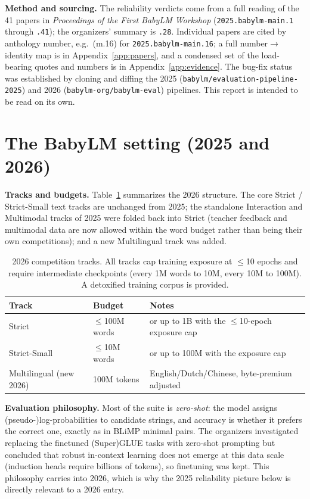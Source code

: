 \documentclass[11pt]{article}
\begin{document}
\textbf{Method and sourcing.} The reliability verdicts come from a full reading of the 41
papers in \emph{Proceedings of the First BabyLM Workshop} (\texttt{2025.babylm-main.1}
through \texttt{.41}); the organizers' summary is \texttt{.28}. Individual papers are cited
by anthology number, e.g.\ (m.16) for \texttt{2025.babylm-main.16}; a full number$\to$identity
map is in Appendix~\ref{app:papers}, and a condensed set of the load-bearing quotes and
numbers is in Appendix~\ref{app:evidence}. The bug-fix status was established by cloning and
diffing the 2025 (\texttt{babylm/evaluation-pipeline-2025}) and 2026
(\texttt{babylm-org/babylm-eval}) pipelines. This report is intended to be read on its own.

\section{The BabyLM setting (2025 and 2026)}
\label{sec:setting}
\textbf{Tracks and budgets.} Table~\ref{tab:tracks} summarizes the 2026 structure. The core
Strict / Strict-Small text tracks are unchanged from 2025; the standalone Interaction and
Multimodal tracks of 2025 were folded back into Strict (teacher feedback and multimodal data
are now allowed within the word budget rather than being their own competitions); and a new
Multilingual track was added.

\begin{table}[h]
\centering\small
\renewcommand{\arraystretch}{1.2}
\begin{tabular}{@{}l l l@{}}
\toprule
\textbf{Track} & \textbf{Budget} & \textbf{Notes}\\
\midrule
Strict & $\le$100M words & or up to 1B with the $\le$10-epoch exposure cap\\
Strict-Small & $\le$10M words & or up to 100M with the exposure cap\\
Multilingual (new 2026) & 100M tokens & English/Dutch/Chinese, byte-premium adjusted\\
\bottomrule
\end{tabular}
\caption{2026 competition tracks. All tracks cap training exposure at $\le$10 epochs and
require intermediate checkpoints (every 1M words to 10M, every 10M to 100M). A detoxified
training corpus is provided.}
\label{tab:tracks}
\end{table}

\textbf{Evaluation philosophy.} Most of the suite is \emph{zero-shot}: the model assigns
(pseudo-)log-probabilities to candidate strings, and accuracy is whether it prefers the
correct one, exactly as in BLiMP minimal pairs. The organizers investigated replacing the
finetuned (Super)GLUE tasks with zero-shot prompting but concluded that robust in-context
learning does not emerge at this data scale (induction heads require billions of tokens), so
finetuning was kept. This philosophy carries into 2026, which is why the 2025 reliability
picture below is directly relevant to a 2026 entry.
\end{document}
